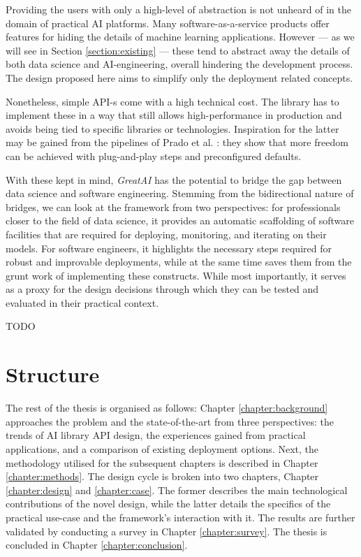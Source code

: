 Providing the users with only a high-level of abstraction is not unheard of in the domain of practical AI platforms. Many software-as-a-service products offer features for hiding the details of machine learning applications. However --- as we will see in Section \ref{section:existing} --- these tend to abstract away the details of both data science and AI-engineering, overall hindering the development process. The design proposed here aims to simplify only the deployment related concepts.

Nonetheless, simple API-s come with a high technical cost. The library has to implement these in a way that still allows high-performance in production \cite{kleppmann2017designing} and avoids being tied to specific libraries or technologies. Inspiration for the latter may be gained from the pipelines of Prado et al. \cite{prado2020bonseyes}: they show that more freedom can be achieved with plug-and-play steps and preconfigured defaults. 

With these kept in mind, \textit{GreatAI} has the potential to bridge the gap between data science and software engineering. Stemming from the bidirectional nature of bridges, we can look at the framework from two perspectives: for professionals closer to the field of data science, it provides an automatic scaffolding of software facilities that are required for deploying, monitoring, and iterating on their models. For software engineers, it highlights the necessary steps required for robust and improvable deployments, while at the same time saves them from the grunt work of implementing these constructs. While most importantly, it serves as a proxy for the design decisions through which they can be tested and evaluated in their practical context.

TODO

\section{Structure}

The rest of the thesis is organised as follows: Chapter \ref{chapter:background} approaches the problem and the state-of-the-art from three perspectives: the trends of AI library API design, the experiences gained from practical applications, and a comparison of existing deployment options. Next, the methodology utilised for the subsequent chapters is described in Chapter \ref{chapter:methods}. The design cycle is broken into two chapters, Chapter  \ref{chapter:design} and \ref{chapter:case}. The former describes the main technological contributions of the novel design, while the latter details the specifics of the practical use-case and the framework's interaction with it. The results are further validated by conducting a survey in Chapter \ref{chapter:survey}. The thesis is concluded in Chapter \ref{chapter:conclusion}.
